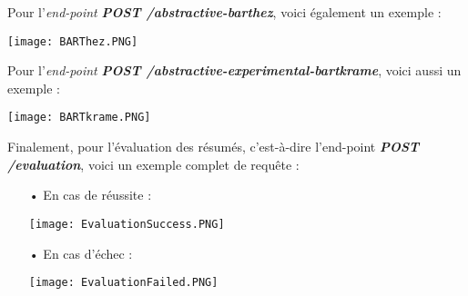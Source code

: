 Pour l'\textit{end-point} \textbf{\textit{POST /abstractive-barthez}}, voici également un exemple :
\begin{center}
\texttt{[image: BARThez.PNG]}
\end{center}
Pour l'\textit{end-point} \textbf{\textit{POST /abstractive-experimental-bartkrame}}, voici aussi un exemple :
\begin{center}
\texttt{[image: BARTkrame.PNG]}
\end{center}

Finalement, pour l'évaluation des résumés, c'est-à-dire l'end-point \textbf{\textit{POST /evaluation}}, voici un exemple complet de requête :
\begin{itemize}
\item[•] En cas de réussite :
\begin{center}
\texttt{[image: EvaluationSuccess.PNG]}
\end{center}
\item[•] En cas d'échec :
\begin{center}
\texttt{[image: EvaluationFailed.PNG]}
\end{center}
\end{itemize}
